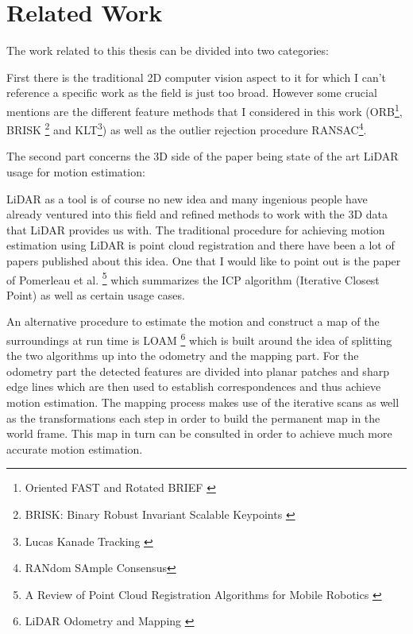 \chapter{Related Work}\label{ch:related_work}

The work related to this thesis can be divided into two categories:

First there is the traditional 2D computer vision aspect to it for which I can't reference a specific work as the field is just too broad. However some crucial mentions are the different feature methods that I considered in this work (ORB\footnote{Oriented FAST and Rotated BRIEF \citep{ORB}}, BRISK \footnote{BRISK: Binary Robust Invariant Scalable Keypoints \citep{BRISK}} and KLT\footnote{Lucas Kanade Tracking \citep{KLT}}) as well as the outlier rejection procedure RANSAC\footnote{RANdom SAmple Consensus\citep{ransac}}.

The second part concerns the 3D side of the paper being state of the art LiDAR usage for motion estimation:

LiDAR as a tool is of course no new idea and many ingenious people have already 
ventured into this field and refined methods to work with the 3D data that LiDAR 
provides us with. The traditional procedure for achieving motion estimation using LiDAR is point cloud registration and there have been a lot of papers published about this idea. One that I would like to point out is the paper of Pomerleau et al. \footnote{A Review of Point Cloud Registration Algorithms for Mobile Robotics \citep{Pomerleau}} which summarizes the ICP algorithm (Iterative Closest Point) as well as certain usage cases.

An alternative procedure to estimate the motion and construct a map of the surroundings at run time is LOAM \footnote{LiDAR Odometry and Mapping \citep{LOAM}} which is built around the idea of splitting the two algorithms up into the odometry and the mapping part.
For the odometry part the detected features are divided into planar patches and sharp edge lines which are then used to establish correspondences and thus achieve motion estimation. 
The mapping process makes use of the iterative scans as well as the transformations each step in order to build the permanent map in the world frame. This map in turn can be consulted in order to achieve much more accurate motion estimation.\\

